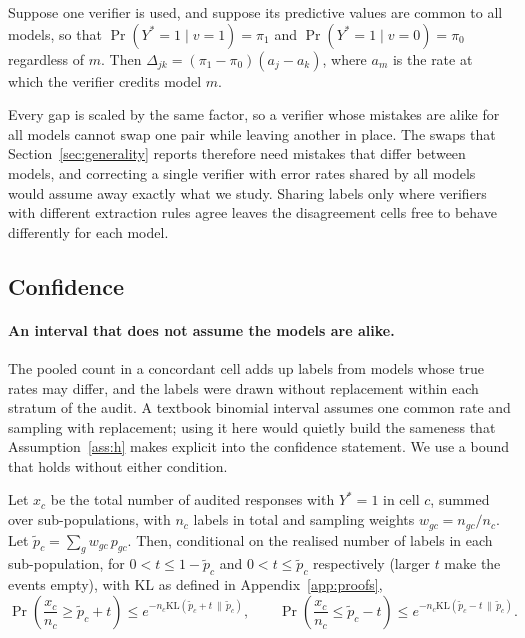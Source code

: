 \begin{proposition}
\label{prop:oneverifier}
Suppose one verifier is used, and suppose its predictive values are common to all models, so
that $\Pr(Y^* = 1 \mid v = 1) = \pi_1$ and $\Pr(Y^* = 1 \mid v = 0) = \pi_0$ regardless of $m$.
Then $\Delta_{jk} = (\pi_1 - \pi_0)(a_j - a_k)$, where $a_m$ is the rate at which the verifier
credits model $m$.
\end{proposition}

Every gap is scaled by the same factor, so a verifier whose mistakes are alike for all models
cannot swap one pair while leaving another in place. The swaps that Section~\ref{sec:generality}
reports therefore need mistakes that differ between models, and correcting a single verifier with
error rates shared by all models would assume away exactly what we study. Sharing labels only where
verifiers with different extraction rules agree leaves the disagreement cells free to behave
differently for each model.

\subsection{Confidence}
\label{sec:inference}

\paragraph{An interval that does not assume the models are alike.}
The pooled count in a concordant cell adds up labels from models whose true rates may differ, and
the labels were drawn without replacement within each stratum of the audit. A textbook binomial
interval assumes one common rate and sampling with replacement; using it here would quietly build
the sameness that Assumption~\ref{ass:h} makes explicit into the confidence statement. We use a
bound that holds without either condition.

\begin{lemma}
\label{lem:kl}
Let $x_c$ be the total number of audited responses with $Y^* = 1$ in cell $c$, summed over
sub-populations, with $n_c$ labels in total and sampling weights $w_{gc} = n_{gc}/n_c$. Let
$\tilde p_c = \sum_g w_{gc}\, p_{gc}$. Then, conditional on the realised number of labels in each
sub-population, for $0 < t \le 1 - \tilde p_c$ and $0 < t \le \tilde p_c$ respectively (larger $t$
make the events empty), with $\mathrm{KL}$ as defined in Appendix~\ref{app:proofs},
\[
\Pr\!\left(\frac{x_c}{n_c} \ge \tilde p_c + t\right) \le e^{-n_c \mathrm{KL}(\tilde p_c + t \,\|\, \tilde p_c)},
\qquad
\Pr\!\left(\frac{x_c}{n_c} \le \tilde p_c - t\right) \le e^{-n_c \mathrm{KL}(\tilde p_c - t \,\|\, \tilde p_c)} .
\]
\end{lemma}

